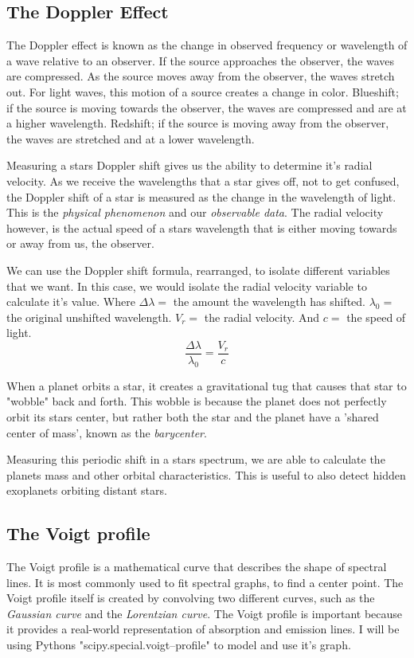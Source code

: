 \documentclass[aps,onecolumn,12pt,letterpaper,amsmath,amssymb,floatfix,pra,notitlepage]
{revtex4-1}
\begin{document}
\subsection{The Doppler Effect}
The Doppler effect is known as the change in observed frequency or wavelength of a wave relative to an observer. If the source approaches the observer, the waves are compressed. As the source moves away from the observer, the waves stretch out. For light waves, this motion of a source creates a change in color. Blueshift; if the source is moving towards the observer, the waves are compressed and are at a higher wavelength. Redshift; if the source is moving away from the observer, the waves are stretched and at a lower wavelength. 

Measuring a stars Doppler shift gives us the ability to determine it's radial velocity. As we receive the wavelengths that a star gives off, not to get confused, the Doppler shift of a star is measured as the change in the wavelength of light. This is the \textit{physical phenomenon} and our \textit{observable data}. The radial velocity however, is the actual speed of a stars wavelength that is either moving towards or away from us, the observer. 

We can use the Doppler shift formula, rearranged, to isolate different variables that we want. In this case, we would isolate the radial velocity variable to calculate it's value. Where \(\Delta\lambda=\) the amount the wavelength has shifted. \(\lambda_\text{0}=\) the original unshifted wavelength. \({V_r}=\) the radial velocity. And \({c}=\) the speed of light.  
$$\frac{\Delta\lambda}{\lambda_{\text{0}}}=\frac{V_r}{c}$$


When a planet orbits a star, it creates a gravitational tug that causes that star to "wobble" back and forth. This wobble is because the planet does not perfectly orbit its stars center, but rather both the star and the planet have a 'shared center of mass', known as the \textit{barycenter}. 

Measuring this periodic shift in a stars spectrum, we are able to calculate the planets mass and other orbital characteristics. This is useful to also detect hidden exoplanets orbiting distant stars. 

\subsection{The Voigt profile}
The Voigt profile is a mathematical curve that describes the shape of spectral lines. It is most commonly used to fit spectral graphs, to find a center point. The Voigt profile itself is created by convolving two different curves, such as the \textit{Gaussian curve} and the \textit{Lorentzian curve}. The Voigt profile is important because it provides a real-world representation of absorption and emission lines. I will be using Pythons "scipy.special.voigt--profile" to model and use it's graph. 
\end{document}
